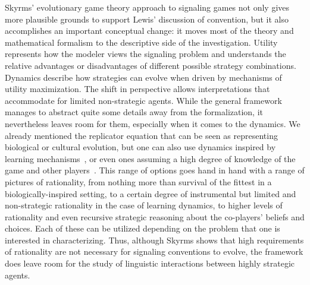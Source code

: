 \documentclass[a4paper]{article}
\begin{document}
Skyrms' evolutionary game theory approach to signaling games not only gives more plausible grounds to support Lewis' discussion of convention, but it also accomplishes an important conceptual change: it moves most of the theory and mathematical formalism to the descriptive side of the investigation.
Utility represents how the modeler views the signaling problem and understands the relative advantages or disadvantages of different possible strategy combinations.
Dynamics describe how strategies can evolve when driven by mechanisms of utility maximization.
The shift in perspective allows interpretations that accommodate for limited non-strategic agents.
While the general framework manages to abstract quite some details away from the formalization, it nevertheless leaves room for them, especially when it comes to the dynamics.
We already mentioned the replicator equation that can be seen as representing biological or cultural evolution, but one can also use dynamics inspired by learning mechanisms~\parencite[\emph{e.g.}][]{roth_learning_1995}, or even ones assuming a high degree of knowledge of the game and other players~\parencite[\emph{e.g.}][]{gilboa_social_1991,Muhlenbernd2011:Learning-with-N,SpikeStadler2016:Minimal-Require}.
This range of options goes hand in hand with a range of pictures of rationality, from nothing more than survival of the fittest in a biologically-inspired setting, to a certain degree of instrumental but limited and non-strategic rationality in the case of learning dynamics, to higher levels of rationality and even recursive strategic reasoning about the co-players' beliefs and choices.
Each of these can be utilized depending on the problem that one is interested in characterizing.
Thus, although Skyrms shows that high requirements of rationality are not necessary for signaling conventions to evolve, the framework does leave room for the study of linguistic interactions between highly strategic agents.
\end{document}
